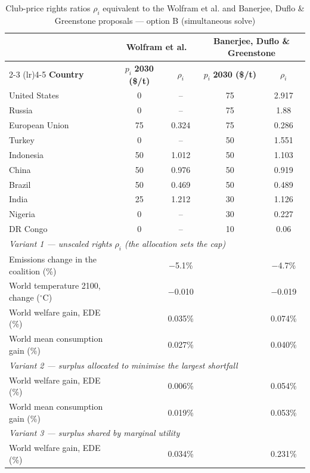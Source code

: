 \begin{table}[htbp]
\centering
\small
\caption{Club-price rights ratios $\rho_i$ equivalent to the Wolfram et al. and Banerjee, Duflo \& Greenstone proposals --- option B (simultaneous solve)}
\renewcommand{\arraystretch}{1.15}
\begin{tabular}{lcccc}
  \toprule
  & \multicolumn{2}{c}{\textbf{Wolfram et al.}} & \multicolumn{2}{c}{\textbf{Banerjee, Duflo \& Greenstone}} \\
  \cmidrule(lr){2-3} \cmidrule(lr){4-5}
  \textbf{Country} & $p_i$ \textbf{2030 (\$/t)} & $\rho_i$ & $p_i$ \textbf{2030 (\$/t)} & $\rho_i$ \\
  \midrule
  United States & 0 & -- & 75 & 2.917 \\
  Russia & 0 & -- & 75 & 1.88 \\
  European Union & 75 & 0.324 & 75 & 0.286 \\
  Turkey & 0 & -- & 50 & 1.551 \\
  Indonesia & 50 & 1.012 & 50 & 1.103 \\
  China & 50 & 0.976 & 50 & 0.919 \\
  Brazil & 50 & 0.469 & 50 & 0.489 \\
  India & 25 & 1.212 & 30 & 1.126 \\
  Nigeria & 0 & -- & 30 & 0.227 \\
  DR Congo & 0 & -- & 10 & 0.06 \\
  \midrule
  \multicolumn{5}{l}{\textit{Variant 1 --- unscaled rights $\rho_i$ (the allocation sets the cap)}} \\
  \quad Emissions change in the coalition (\%) &  & $-$5.1\% &  & $-$4.7\% \\
  \quad World temperature 2100, change ($^\circ$C) &  & $-$0.010 &  & $-$0.019 \\
  \quad World welfare gain, EDE (\%) &  & 0.035\% &  & 0.074\% \\
  \quad World mean consumption gain (\%) &  & 0.027\% &  & 0.040\% \\
  \midrule
  \multicolumn{5}{l}{\textit{Variant 2 --- surplus allocated to minimise the largest shortfall}} \\
  \quad World welfare gain, EDE (\%) &  & 0.006\% &  & 0.054\% \\
  \quad World mean consumption gain (\%) &  & 0.019\% &  & 0.053\% \\
  \midrule
  \multicolumn{5}{l}{\textit{Variant 3 --- surplus shared by marginal utility}} \\
  \quad World welfare gain, EDE (\%) &  & 0.034\% &  & 0.231\% \\

\end{tabular}
\end{table}
